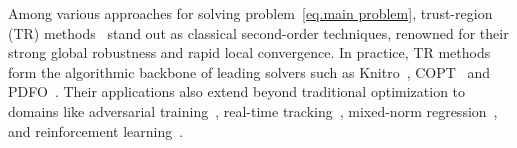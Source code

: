 \documentclass{mcom-l}
\numberwithin{equation}{section}
\begin{document}




Among various approaches for solving problem~\eqref{eq.main problem}, trust-region (TR) methods~\cite{More1983,conn2000trust,yuan2015recent} stand out as classical second-order techniques, renowned for their strong global robustness and rapid local convergence. In practice, TR methods form the algorithmic backbone of leading solvers such as Knitro~\cite{byrd2006k}, COPT~\cite{geCardinalOptimizerCOPT2022} and PDFO~\cite{ragonneau2024pdfo}. Their applications also extend beyond traditional optimization to domains like adversarial training~\cite{yao2019trust}, real-time tracking~\cite{liu2004real}, mixed-norm regression~\cite{kim2010scalable}, and reinforcement learning~\cite{schulman2015trust,kurutach2018model}.
\end{document}
